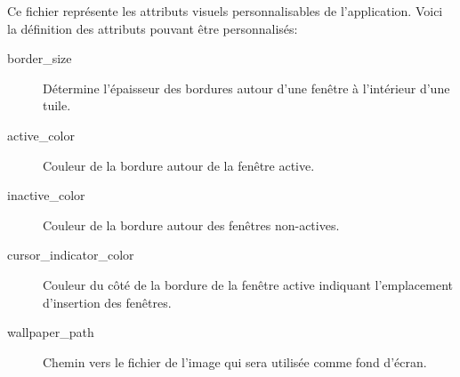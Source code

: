 \documentclass[titlepage]{article}
\begin{document}
\par
Ce fichier représente les attributs visuels personnalisables de l'application. Voici la définition des attributs pouvant être personnalisés:
\begin{description}
	\item [border\_size] Détermine l'épaisseur des bordures autour d'une fenêtre à l'intérieur d'une tuile.
	\item [active\_color] Couleur de la bordure autour de la fenêtre active.
	\item [inactive\_color] Couleur de la bordure autour des fenêtres non-actives.
	\item [cursor\_indicator\_color] Couleur du côté de la bordure de la fenêtre active indiquant l'emplacement d'insertion des fenêtres.
	\item [wallpaper\_path] Chemin vers le fichier de l'image qui sera utilisée comme fond d'écran.
\end{description}
\end{document}
